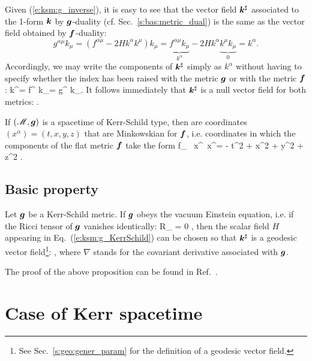 Given (\ref{e:ksm:g_inverse}), it is easy to see that the vector field
$\bm{k}^\sharp$ associated
to the 1-form $\bm{k}$ by $\bm{g}$-duality (cf. Sec.~\ref{s:bas:metric_dual})
is the same as the vector field
obtained by $\bm{f}$-duality:
\[
    g^{\alpha\mu} k_\mu = (f^{\alpha\mu} - 2 H k^\alpha k^\mu) k_\mu
                        = \underbrace{f^{\alpha\mu} k_\mu}_{k^\alpha}
                          - 2H k^\alpha \underbrace{k^\mu k_\mu}_{0}
                        = k^\alpha .
\]
Accordingly, we may write the components of $\bm{k}^\sharp$ simply as $k^\alpha$
without having to specify whether the index has been raised with the
metric $\bm{g}$ or with the metric $\bm{f}$:
\be
    k^\alpha = f^{\alpha\mu} k_\mu  = g^{\alpha\mu} k_\mu .
\ee
It follows immediately that $\bm{k}^\sharp$ is a null vector field for
both metrics:
\be
   .
\ee


If $(\mathscr{M},\bm{g})$ is a spacetime of Kerr-Schild type, then 
are coordinates $(x^\alpha) = (t,x,y,z)$ that are Minkowskian
for $\bm{f}$, i.e. coordinates in which the components of the flat metric
$\bm{f}$ take the form
\be \label{e:ksm:ds_eta}
    f_{\mu\nu} \, \D x^\mu \, \D x^\nu = - \D t^2 + \D x^2 + \D y^2
        + \D z^2 .
\ee

\subsection{Basic property}

\begin{greybox}
Let $\bm{g}$ be a Kerr-Schild metric.
If $\bm{g}$ obeys the vacuum Einstein
equation, i.e. if the Ricci tensor of $\bm{g}$ vanishes identically:
\be
    R_{\alpha\beta} = 0 ,
\ee
then the scalar field $H$ appearing in Eq.~(\ref{e:ksm:g_KerrSchild})
can be chosen so that $\bm{k}^\sharp$ is a geodesic vector field\footnote{See Sec.~\ref{s:geo:gener_param} for the definition of a geodesic vector field.}:
\be
    ,
\ee
where $\nabla$ stands for the covariant derivative associated with $\bm{g}$.
\end{greybox}

The proof of the above proposition can be found in Ref.~\cite{KerrS65}.



\section{Case of Kerr spacetime}

